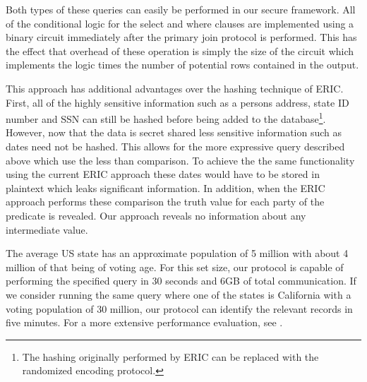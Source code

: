 Both types of these queries can easily be performed in our secure framework. All of the conditional logic for the select and where clauses are implemented using a binary circuit immediately after the primary join protocol is performed. This has the effect that overhead of these operation is simply the size of the circuit which implements the logic times the number of potential rows contained in the output. 

This approach has additional advantages over the hashing technique of ERIC. First, all of the highly sensitive information such as a persons address, state ID number and SSN can still be hashed before being added to the database\footnote{The hashing originally performed by ERIC can be replaced with the randomized encoding protocol.}. However, now that the data is secret shared less sensitive information such as dates need not be hashed. This allows for the more expressive query described above which use the less than comparison. To achieve the the same functionality using the current ERIC approach these dates would have to be stored in plaintext which leaks significant information. In addition, when the ERIC approach performs these comparison the truth value for each party of the predicate is revealed. Our approach reveals no information about any intermediate value. 

The average US state has an approximate population of 5 million with about 4 million of that being of voting age. For this set size, our protocol is capable of performing the specified query in 30 seconds and 6GB of total communication. If we consider running the same query where one of the states is California with a voting population of 30 million, our protocol can identify the relevant records in five minutes. For a more extensive performance evaluation, see .


